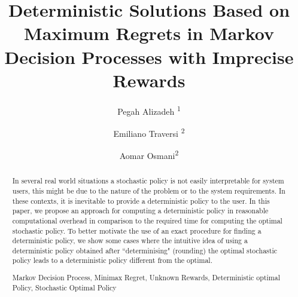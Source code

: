 \documentclass[runningheads,a4paper]{llncs}
\newcommand{\up}[1]{\textsuperscript{#1}}
\newcommand{\keywords}[1]{\par\addvspace\baselineskip
\noindent\keywordname\enspace\ignorespaces#1}
\begin{document}
\mainmatter  %

\title{Deterministic Solutions Based on Maximum Regrets in Markov Decision Processes with Imprecise Rewards}


%
%

\author{Pegah Alizadeh \up{1} \and Emiliano Traversi \up{2} \and Aomar Osmani\up{2}}

%



%
%

\maketitle


\begin{abstract}
In several real world situations a stochastic policy is not easily interpretable for system users, this might be due to the nature of the problem or to the system requirements. In these contexts, it is inevitable to provide a deterministic policy to the user. In this paper, we propose an approach for computing a deterministic policy in reasonable computational overhead in comparison to the required time for computing the optimal stochastic policy. To better motivate the use of an exact procedure for finding a deterministic policy, we show some cases where the intuitive idea of using a deterministic policy obtained after ``determinising" (rounding) the optimal stochastic policy leads to a deterministic policy different from the optimal.

\keywords{Markov Decision Process, Minimax Regret, Unknown Rewards, Deterministic optimal Policy, Stochastic Optimal Policy}
\end{abstract}
\end{document}
